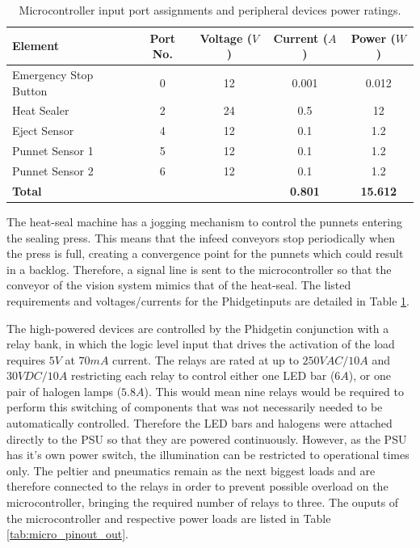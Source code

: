 \documentclass[fleqn,twoside]{article}
\begin{document}
\renewcommand{\arraystretch}{0.8}%
\begin{table}[h]
	\caption{Microcontroller input port assignments and peripheral devices power ratings.}
	\label{tab:micro_pinout_in}
	\begin{tabularx}{\linewidth}{Xcccc}
		
		\toprule
		\textbf{Element}  & \textbf{Port No.} & \textbf{Voltage ($V$)} & \textbf{Current ($A$)} & \textbf{Power ($W$)}\\[8pt]
		\midrule
		Emergency Stop Button 	& 0 & 12 & 0.001 & 0.012  \\[4pt]
		\midrule
		Heat Sealer 			& 2 & 24 & 0.5 & 12 \\[4pt]
		\midrule
		Eject Sensor 			& 4 & 12 & 0.1 & 1.2  \\[4pt]
		\midrule
		Punnet Sensor 1 		& 5 & 12 & 0.1 & 1.2 \\[4pt]
		\midrule
		Punnet Sensor 2 		& 6 & 12 & 0.1 & 1.2  \\[4pt]
		\midrule
		\textbf{Total} 			&   &    & \textbf{0.801} & \textbf{15.612} \\[4pt]
		\bottomrule
		
	\end{tabularx}
\end{table}


The heat-seal machine has a jogging mechanism to control the punnets entering the sealing press. This means that the infeed conveyors stop periodically when the press is full, creating a convergence point for the punnets which could result in a backlog. Therefore, a signal line is sent to the microcontroller so that the conveyor of the vision system mimics that of the heat-seal. The listed requirements and voltages/currents for the Phidget\texttrademark inputs are detailed in Table \ref{tab:micro_pinout_in}.

The high-powered devices are controlled by the Phidget\texttrademark in conjunction with a relay bank, in which the logic level input that drives the activation of the load requires $5V$ at $70mA$ current. The relays are rated at up to $250VAC/10A$ and $30VDC/10A$ restricting each relay to control either one LED bar ($6A$), or one pair of halogen lamps ($5.8A$). This would mean nine relays would be required to perform this switching of components that was not necessarily needed to be automatically controlled. Therefore the LED bars and halogens were attached directly to the PSU so that they are powered continuously. However, as the PSU has it's own power switch, the illumination can be restricted to operational times only. The peltier and pneumatics remain as the next biggest loads and are therefore connected to the relays in order to prevent possible overload on the microcontroller, bringing the required number of relays to three. The ouputs of the microcontroller and respective power loads are listed in Table \ref{tab:micro_pinout_out}.
\end{document}
